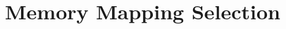 \hypertarget{group___memory___mapping___selection}{}\section{Memory Mapping Selection}
\label{group___memory___mapping___selection}
